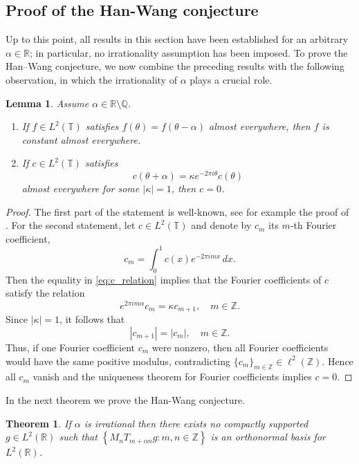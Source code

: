 \documentclass[reqno,a4paper,12pt]{amsart}
\numberwithin{equation}{section}
\newtheorem{theorem}[definition]{Theorem}
\newtheorem{lemma}[definition]{Lemma}
\def\R{{\mathbb R}}
\def\T{{\mathbb T}}
\def\Q{{\mathbb Q}}
\newcommand\1{\mathds{1}}
\begin{document}
\subsection{Proof of the Han-Wang conjecture}

Up to this point, all results in this section have been established for an arbitrary $\alpha \in \R$; in particular, no irrationality assumption has been imposed. To prove the Han–Wang conjecture, we now combine the preceding results with the following observation, in which the irrationality of $\alpha$ plays a crucial role.

\begin{lemma}\label{lem:irrational-torus-obstructions}
Assume $\alpha \in \R \setminus \Q$.
\begin{enumerate}
\item If $f\in L^2(\mathbb T)$ satisfies $f(\theta)=f(\theta-\alpha)$ almost everywhere, then $f$ is constant almost everywhere.

\item If $c\in L^2(\mathbb T)$ satisfies
\begin{equation}\label{eq:c_relation}
c(\theta+\alpha)=\kappa e^{-2\pi i\theta}c(\theta)
\end{equation}
almost everywhere for some $|\kappa|=1$, then $c=0$.
\end{enumerate}
\end{lemma}

\begin{proof}
The first part of the statement is well-known, see for example the proof of \cite[Proposition 2.16]{EW12}.
For the second statement, let $c \in L^2(\T)$ and denote by $c_m$ its $m$-th Fourier coefficient,
$$
c_m=\int_0^1 c(x)e^{-2\pi i m x}\,dx .
$$
Then the equality in \eqref{eq:c_relation} implies that the Fourier coefficients of $c$ satisfy the relation
$$
e^{2\pi i m\alpha}c_m=\kappa c_{m+1},
\quad m\in\mathbb Z.
$$
Since $|\kappa|=1$, it follows that
$$
|c_{m+1}|=|c_m|,
\quad m\in\mathbb Z.
$$
Thus, if one Fourier coefficient $c_m$ were nonzero, then all Fourier
coefficients would have the same positive modulus, contradicting
$\{ c_m \}_{m\in\mathbb Z}\in\ell^2(\mathbb Z)$. Hence all $c_m$ vanish and the uniqueness theorem for Fourier coefficients implies $c=0$.
\end{proof}

In the next theorem we prove the Han-Wang conjecture. 

\begin{theorem}\label{thm:no-compactly-supported-onb}
If $\alpha$ is irrational then there exists no compactly supported $g \in L^2(\R)$ such that $\left\{M_nT_{m+\alpha n}g:m,n\in\mathbb Z\right\}$ is an orthonormal basis for $L^2(\R)$.
\end{theorem}
\end{document}
